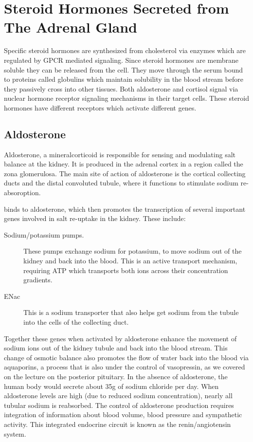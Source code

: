 \documentclass{tufte-handout}
\begin{document}
\section{Steroid Hormones Secreted from The Adrenal Gland}

Specific steroid hormones are synthesized from cholesterol via enzymes which are regulated by GPCR mediated signaling.  Since steroid hormones are membrane soluble they can be released from the cell.  They move through the serum bound to proteins called globulins which maintain solubility in the blood stream before they passively cross into other tissues.  Both aldosterone and cortisol signal via nuclear hormone receptor signaling mechanisms in their target cells.  These steroid hormones have different receptors which activate different genes.

\subsection{Aldosterone}

Aldosterone, a mineralcorticoid is responsible for sensing and modulating salt balance at the kidney.  It is produced in the adrenal cortex in a region called the zona glomerulosa.  The main site of action of aldosterone is the cortical collecting ducts and the distal convoluted tubule, where it functions to stimulate sodium re-absoroption.  

 binds to aldosterone, which then promotes the transcription of several important genes involved in salt re-uptake in the kidney.  These include:

\begin{description}
 \item[Sodium/potassium pumps.]  These pumps exchange sodium for potassium, to move sodium out of the kidney and back into the blood.  This is an active transport mechanism, requiring ATP which transports both ions across their concentration gradients.
 \item[ENac] This is a sodium transporter that also helps get sodium from the tubule into the cells of the collecting duct.
\end{description}

Together these genes when activated by aldosterone enhance the movement of sodium ions out of the kidney tubule and back into the blood stream.  This change of osmotic balance also promotes the flow of water back into the blood via aquaporins, a process that is also under the control of vasopressin, as we covered on the lecture on the posterior pituitary.  In the absence of aldosterone, the human body would secrete about 35g of sodium chloride per day.  When aldosterone levels are high (due to reduced sodium concentration), nearly all tubular sodium is reabsorbed.  The control of aldosterone production requires integration of information about blood volume, blood pressure and sympathetic activity.  This integrated endocrine circuit is known as the renin/angiotensin system.  
\end{document}
